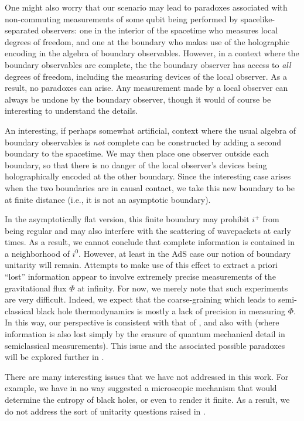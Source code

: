 \documentclass[12pt,onecolumn,eqsecnum,aps,prd,nofootinbib]{revtex4}
\begin{document}
One might also worry that our scenario may lead to paradoxes associated with
non-commuting measurements of some qubit being performed by
spacelike-separated observers: one in the interior of the spacetime
who measures local degrees of freedom, and one at the boundary who
makes use of the holographic encoding in the
algebra of boundary observables.  However, in a context where the boundary observables are complete,
the  the boundary observer has access to {\em all} degrees
of freedom, including the measuring devices of the local observer.
As a result, no paradoxes can arise. Any measurement made by a local
observer can always be undone by the boundary observer, though it would of course be interesting to understand the details.

An interesting, if perhaps somewhat artificial, context where the usual algebra of boundary observables is {\it not} complete can be constructed by adding a second boundary to the spacetime.  We may then place one observer outside each boundary, so that there is no danger of the local observer's devices being holographically encoded at the other boundary.  Since the interesting case arises when the two boundaries are in causal contact, we take this new boundary to be at finite distance (i.e., it is not an asymptotic boundary).

In the asymptotically flat version, this finite boundary may prohibit $i^+$ from being regular and may also interfere with the scattering of
wavepackets at early times.  As a result, we cannot conclude that
complete information is contained in a neighborhood of $i^0$.
However, at least in the AdS case our notion of boundary unitarity
will remain. Attempts to make use of this effect to extract a priori ``lost'' information appear to involve
extremely precise measurements of the gravitational flux $\Phi$ at
infinity. For now, we merely note that such experiments are very
difficult.  Indeed, we expect that the coarse-graining which leads
to semi-classical black hole thermodynamics is mostly a lack of
precision in measuring $\Phi$.  In this way, our perspective is
consistent with that of \cite{BMR}, and also with \cite{VB} (where information is also lost
simply by the erasure of quantum mechanical detail in semiclassical
measurements). This issue and the associated possible
paradoxes will be explored further in \cite{soon}.

There are many interesting issues that we have not addressed in this work.  For example, we have in no way suggested a microscopic mechanism that would determine
the entropy of black holes, or even to render it  finite.  As a result, we do not address the sort of unitarity
questions raised in \cite{Maldacena,Hawking}.
\end{document}
